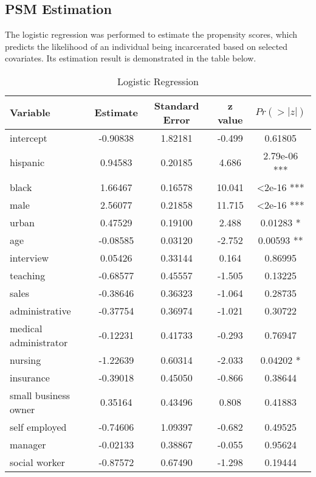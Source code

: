 \documentclass{article}[12pt]
\begin{document}
\subsection{PSM Estimation}
The logistic regression was performed to estimate the propensity scores, which predicts the likelihood of an individual being incarcerated based on selected covariates. Its estimation result is demonstrated in the table below.
\par 
\begin{table}[htbp]
    \centering
    \caption{Logistic Regression}
    \label{tab: Logistic Regression}
    \begin{tabular}{lcccc}
        \toprule
        \textbf{Variable} & \textbf{Estimate} & \textbf{Standard Error} & \textbf{z value} & \textbf{$Pr(>|z|)$} \\
        \midrule
        intercept & -0.90838 & 1.82181 & -0.499 & 0.61805 \\
        hispanic & 0.94583 & 0.20185 & 4.686 &  2.79e-06 *** \\
        black & 1.66467 & 0.16578 & 10.041 & \textless 2e-16 *** \\
        male & 2.56077 & 0.21858 & 11.715 & \textless 2e-16 *** \\
        urban & 0.47529 & 0.19100 & 2.488 &  0.01283 * \\
        age & -0.08585 & 0.03120 & -2.752 & 0.00593 ** \\
        interview & 0.05426 & 0.33144 & 0.164 & 0.86995 \\
        teaching & -0.68577 & 0.45557 & -1.505 & 0.13225 \\
        sales & -0.38646 & 0.36323 & -1.064 & 0.28735 \\
        administrative & -0.37754 & 0.36974 & -1.021 & 0.30722 \\
        medical administrator & -0.12231 & 0.41733 & -0.293 & 0.76947 \\
        nursing & -1.22639 & 0.60314 & -2.033 & 0.04202 * \\
        insurance & -0.39018 & 0.45050 & -0.866 & 0.38644 \\
        small business owner & 0.35164 & 0.43496 & 0.808 & 0.41883 \\
        self employed & -0.74606 & 1.09397 & -0.682 & 0.49525 \\
        manager & -0.02133 & 0.38867 & -0.055 & 0.95624 \\
        social worker & -0.87572 & 0.67490 & -1.298 & 0.19444 \\
        \bottomrule
    \end{tabular}
\end{table}
\end{document}
